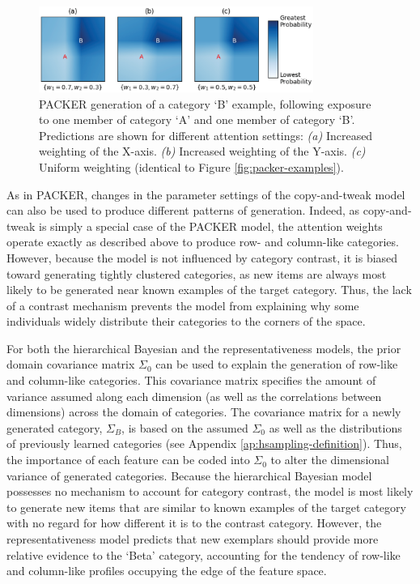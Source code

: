 \documentclass[pdflatex,sn-apa]{sn-jnl}%
\theoremstyle{thmstyleone}%
\theoremstyle{thmstyletwo}%
\theoremstyle{thmstylethree}%
\begin{document}
\begin{figure}
    \begin{center} \includegraphics[width=0.8\textwidth]{figs/fig13.eps}
    \caption{PACKER generation of a category `B' example, following exposure to
one member of category `A' and one member of category `B'. Predictions are shown
for different attention settings: {\em (a)} Increased weighting of the X-axis.
{\em (b)} Increased weighting of the Y-axis. {\em (c)} Uniform weighting
(identical to Figure \ref{fig:packer-examples}).}
    \label{fig:packer-attention}
    \end{center}
\end{figure}

As in PACKER, changes in the parameter settings of the copy-and-tweak model can
also be used to produce different patterns of generation. Indeed, as
copy-and-tweak is simply a special case of the PACKER model, the attention
weights operate exactly as described above to produce row- and column-like
categories. However, because the model is not influenced by category contrast,
it is biased toward generating tightly clustered categories, as new items are
always most likely to be generated near known examples of the target category.
Thus, the lack of a contrast mechanism prevents the model from explaining why
some individuals widely distribute their categories to the corners of the space.

For both the hierarchical Bayesian and the representativeness models, the prior
domain covariance matrix $\Sigma_0$ can be used to explain the generation of
row-like and column-like categories. This covariance matrix specifies the amount
of variance assumed along each dimension (as well as the correlations between dimensions) across the domain of categories. The covariance matrix for a newly
generated category, $\Sigma_B$, is based on the assumed $\Sigma_0$ as well as
the distributions of previously learned categories (see Appendix
\ref{ap:hsampling-definition}). Thus, the importance of each feature can be
coded into $\Sigma_0$ to alter the dimensional variance of generated categories.
Because the hierarchical Bayesian model possesses no mechanism to account for
category contrast, the model is most likely to generate new items that are
similar to known examples of the target category with no regard for how
different it is to the contrast category. However, the representativeness model
predicts that new exemplars should provide more relative evidence to the `Beta'
category, accounting for the tendency of row-like and column-like profiles
occupying the edge of the feature space.
\end{document}
